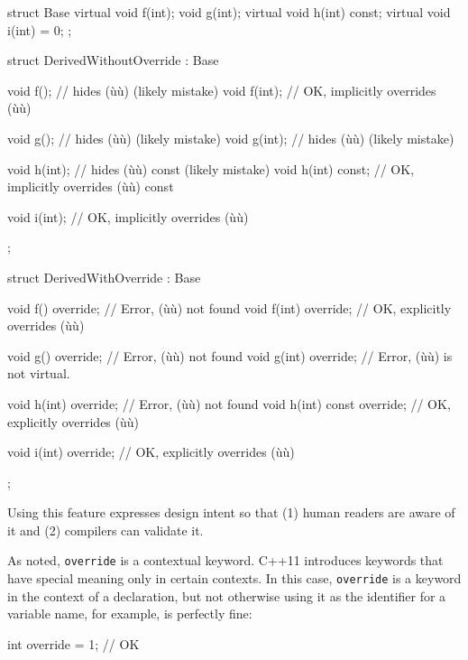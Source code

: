 \begin{emcppslisting}
struct Base
{
    virtual void f(int);
            void g(int);
    virtual void h(int) const;
    virtual void i(int) = 0;
};

struct DerivedWithoutOverride : Base
{
    void f();             // hides (ù{}ù) (likely mistake)
    void f(int);          // OK, implicitly overrides (ù{}ù)

    void g();             // hides (ù{}ù) (likely mistake)
    void g(int);          // hides (ù{}ù) (likely mistake)

    void h(int);          // hides (ù{}ù) const (likely mistake)
    void h(int) const;    // OK, implicitly overrides (ù{}ù) const

    void i(int);          // OK, implicitly overrides (ù{}ù)
};

struct DerivedWithOverride : Base
{
    void f()          override;    // Error, (ù{}ù) not found
    void f(int)       override;    // OK, explicitly overrides (ù{}ù)

    void g()          override;    // Error, (ù{}ù) not found
    void g(int)       override;    // Error, (ù{}ù) is not virtual.

    void h(int)       override;    // Error, (ù{}ù) not found
    void h(int) const override;    // OK, explicitly overrides (ù{}ù)

    void i(int)       override;    // OK, explicitly overrides (ù{}ù)
};
\end{emcppslisting}

\noindent Using this feature expresses design intent so that (1) human readers
are aware of it and (2) compilers can validate it.

As noted, \lstinline!override! is a contextual keyword. C++11 introduces keywords that have special meaning only in certain contexts.   In this case, \lstinline!override! is a keyword in the context of a declaration, but not otherwise using it as the identifier for a variable name, for example, is perfectly fine:

\begin{emcppslisting}
int override = 1;  // OK
\end{emcppslisting}

